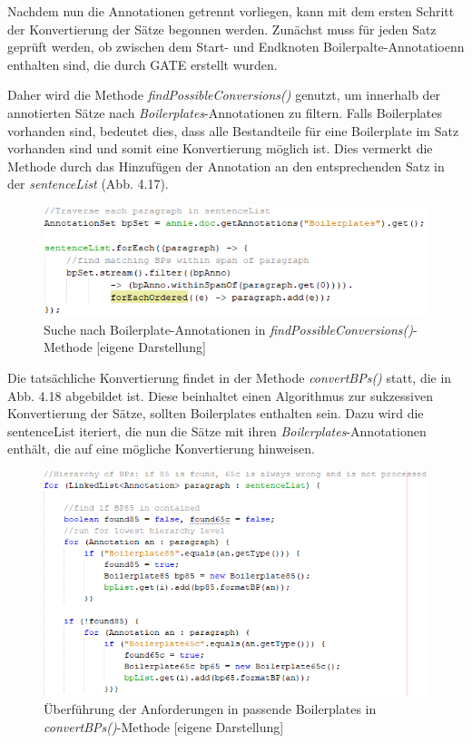 \documentclass[12pt]{report}
\begin{document}
Nachdem nun die Annotationen getrennt vorliegen, kann mit dem ersten Schritt der Konvertierung der Sätze begonnen werden. Zunächst muss für jeden Satz geprüft werden, ob zwischen dem Start- und Endknoten Boilerpalte-Annotatioenn enthalten sind, die durch GATE erstellt wurden. 

Daher wird die Methode \textit{findPossibleConversions()} genutzt, um innerhalb der annotierten Sätze nach \textit{Boilerplates}-Annotationen zu filtern. Falls Boilerplates vorhanden sind, bedeutet dies, dass alle Bestandteile für eine Boilerplate im Satz vorhanden sind und somit eine Konvertierung möglich ist. Dies vermerkt die Methode durch das Hinzufügen der Annotation an den entsprechenden Satz in der \textit{sentenceList} (Abb. 4.17).

\begin{figure}[h!]
\begin{center}
\includegraphics[scale=1]{Bilder/BoilerplateHandler-findPossibleConversions.png}
\caption{Suche nach Boilerplate-Annotationen in \textit{findPossibleConversions()}-Methode [eigene Darstellung]}
\end{center}
\end{figure}

Die tatsächliche Konvertierung findet in der Methode \textit{convertBPs()} statt, die in Abb. 4.18 abgebildet ist.  Diese beinhaltet einen Algorithmus zur sukzessiven Konvertierung der Sätze, sollten Boilerplates enthalten sein. Dazu wird die sentenceList iteriert, die nun die Sätze mit ihren \textit{Boilerplates}-Annotationen enthält, die auf eine mögliche Konvertierung hinweisen. 

\begin{figure}[h!]
\begin{center}
\includegraphics[scale=1]{Bilder/BoilerplateHandler-convertBPs.png}
\caption{Überführung der Anforderungen in passende Boilerplates in \textit{convertBPs()}-Methode [eigene Darstellung]}
\end{center}
\end{figure}
\end{document}
